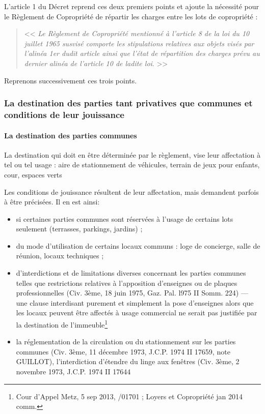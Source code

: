 		L'article 1\ier{} du Décret reprend ces deux premiers points et ajoute la nécessité pour le Règlement de Copropriété de répartir les charges entre les lots de copropriété :
		\begin{quote}
			<< {\itshape Le Règlement de Copropriété mentionné à l'article 8 de la loi du 10 juillet 1965 susvisé comporte les stipulations relatives aux objets visés par l'alinéa 1er dudit article ainsi que l'état de répartition des charges prévu au dernier alinéa de l'article 10 de ladite loi}. >>
		\end{quote}
	
		Reprenons successivement ces trois points.
		
		\subsubsection{La destination des parties tant privatives que communes et conditions de leur jouissance}
		
			\paragraph{La destination des parties communes}
			
				La destination qui doit en être déterminée par le règlement, vise leur affectation à tel ou tel usage : aire de stationnement de véhicules, terrain de jeux pour enfants, cour, espaces verts \etc
				
				Les conditions de jouissance résultent de leur affectation, mais demandent parfois à être précisées. Il en est ainsi:
				\begin{itemize}
					\item si certaines parties communes sont réservées à l'usage de certains lots seulement (terrasses, parkings, jardins) ;
					
					\item du mode d'utilisation de certains locaux communs : loge de concierge, salle de réunion, locaux techniques ;
					
					\item d'interdictions et de limitations diverses concernant les parties communes telles que restrictions relatives à l'apposition d'enseignes ou de plaques professionnelles (Civ. 3ème, 18 juin 1975, Gaz. Pal. l975 II Somm. 224) --- une clause interdisant purement et simplement la pose d’enseignes alors que les locaux peuvent être affectés à usage commercial ne serait pas justifiée par la destination de l’immeuble\footnote{Cour d'Appel Metz, 5 sep 2013, /01701 ; Loyers et Copropriété jan 2014 comm. }
					
					\item la réglementation de la circulation ou du stationnement sur les parties communes (Civ. 3ème, 11 décembre 1973, J.C.P. 1974 II 17659, note GUILLOT), l'interdiction d'étendre du linge aux fenêtres (Civ. 3ème, 2~ novembre 1973, J.C.P. 1974 II 17644
				\end{itemize}
	
